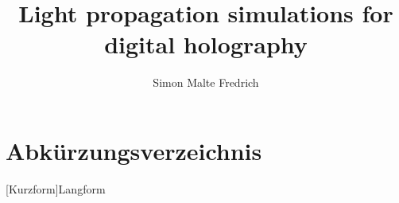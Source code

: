 \documentclass{article}
\begin{document}
\title{Light propagation simulations for digital holography}
\author{Simon Malte Fredrich}
\maketitle
\tableofcontents
\listoffigures
\listoftables
\section*{Abkürzungsverzeichnis}
\begin{acronym}
    [Kurzform]{Langform}
\end{acronym}

\newpage




% 
% 
% 





\printbibliography
\end{document}
